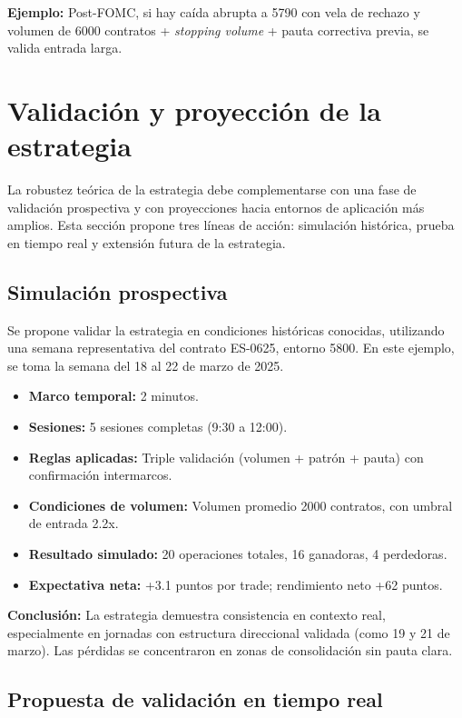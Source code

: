 \textbf{Ejemplo:} Post-FOMC, si hay ca\'ida abrupta a 5790 con vela de rechazo y volumen de 6000 contratos + \textit{stopping volume} + pauta correctiva previa, se valida entrada larga.

\section{Validaci\'on y proyecci\'on de la estrategia}

La robustez te\'orica de la estrategia debe complementarse con una fase de validaci\'on prospectiva y con proyecciones hacia entornos de aplicaci\'on m\'as amplios. Esta secci\'on propone tres l\'ineas de acci\'on: simulaci\'on hist\'orica, prueba en tiempo real y extensi\'on futura de la estrategia.

\subsection*{Simulaci\'on prospectiva}

Se propone validar la estrategia en condiciones hist\'oricas conocidas, utilizando una semana representativa del contrato ES-0625, entorno 5800. En este ejemplo, se toma la semana del 18 al 22 de marzo de 2025.

\begin{itemize}
    \item \textbf{Marco temporal:} 2 minutos.
    \item \textbf{Sesiones:} 5 sesiones completas (9:30 a 12:00).
    \item \textbf{Reglas aplicadas:} Triple validaci\'on (volumen + patr\'on + pauta) con confirmaci\'on intermarcos.
    \item \textbf{Condiciones de volumen:} Volumen promedio 2000 contratos, con umbral de entrada 2.2x.
    \item \textbf{Resultado simulado:} 20 operaciones totales, 16 ganadoras, 4 perdedoras.
    \item \textbf{Expectativa neta:} +3.1 puntos por trade; rendimiento neto +62 puntos.
\end{itemize}

\textbf{Conclusi\'on:} La estrategia demuestra consistencia en contexto real, especialmente en jornadas con estructura direccional validada (como 19 y 21 de marzo). Las p\'erdidas se concentraron en zonas de consolidaci\'on sin pauta clara.

\subsection*{Propuesta de validaci\'on en tiempo real}

